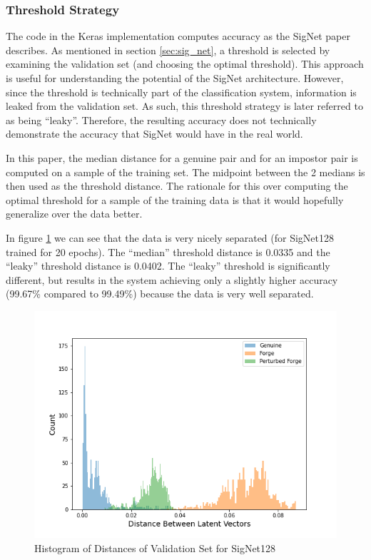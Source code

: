 \subsubsection{Threshold Strategy}\label{sec:threshold}

The code in the Keras implementation computes accuracy as the SigNet paper describes.
As mentioned in section \ref{sec:sig_net}, a threshold is selected by examining the validation set (and choosing the optimal threshold).
This approach is useful for understanding the potential of the SigNet architecture.
However, since the threshold is technically part of the classification system, information is leaked from the validation set.
As such, this threshold strategy is later referred to as being ``leaky''.
Therefore, the resulting accuracy does not technically demonstrate the accuracy that SigNet would have in the real world.

In this paper, the median distance for a genuine pair and for an impostor pair is computed on a sample of the training set.
The midpoint between the 2 medians is then used as the threshold distance.
The rationale for this over computing the optimal threshold for a sample of the training data is that it would hopefully generalize over the data better.

In figure \ref{fig:hist_distances} we can see that the data is very nicely separated (for SigNet128 trained for 20 epochs).
The ``median'' threshold distance is 0.0335 and the ``leaky'' threshold distance is 0.0402.
The ``leaky'' threshold is significantly different, but results in the system achieving only a slightly higher accuracy (99.67\% compared to 99.49\%) because the data is very well separated.
\begin{figure}[h]
    \begin{center}
        \includegraphics[width=0.8\linewidth]{distance_histogram_signet_128.png}
    \end{center}
    \caption{Histogram of Distances of Validation Set for SigNet128}
    \label{fig:hist_distances}
\end{figure}


